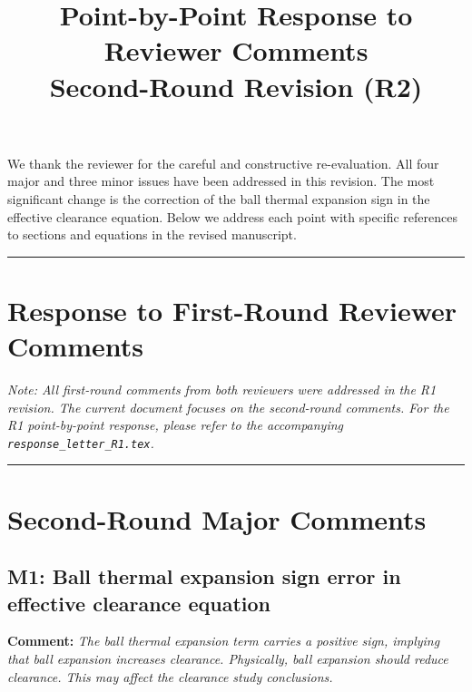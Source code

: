 \documentclass[11pt]{article}
\title{Point-by-Point Response to Reviewer Comments\\[0.5em]\large Second-Round Revision (R2)}
\author{}
\date{}
\newcommand{\reviewer}[1]{\subsection*{#1}}
\newcommand{\comment}[1]{\textbf{Comment:} \textit{#1}\par\medskip}
\begin{document}
\maketitle

\noindent We thank the reviewer for the careful and constructive re-evaluation. All four major and three minor issues have been addressed in this revision. The most significant change is the correction of the ball thermal expansion sign in the effective clearance equation. Below we address each point with specific references to sections and equations in the revised manuscript.

\bigskip
\noindent\rule{\textwidth}{0.4pt}

\section*{Response to First-Round Reviewer Comments}

\textit{Note: All first-round comments from both reviewers were addressed in the R1 revision. The current document focuses on the second-round comments. For the R1 point-by-point response, please refer to the accompanying \texttt{response\_letter\_R1.tex}.}

\bigskip
\noindent\rule{\textwidth}{0.4pt}

\section*{Second-Round Major Comments}

\reviewer{M1: Ball thermal expansion sign error in effective clearance equation}

\comment{The ball thermal expansion term carries a positive sign, implying that ball expansion increases clearance. Physically, ball expansion should reduce clearance. This may affect the clearance study conclusions.}
\end{document}
